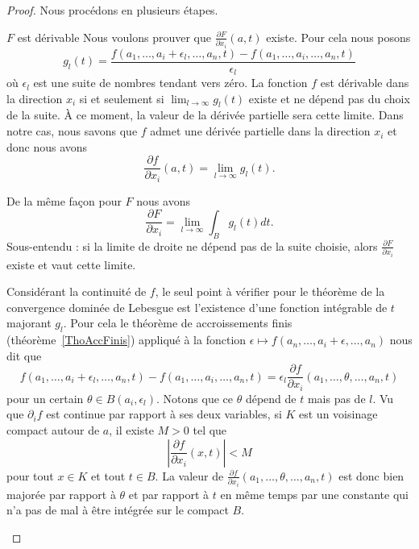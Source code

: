 \begin{proof}
	Nous procédons en plusieurs étapes.
	\begin{subproof}
		\item[\( F\) est dérivable]
		Nous voulons prouver que \( \frac{ \partial F }{ \partial x_i }(a,t)\) existe. Pour cela nous posons
		\begin{equation}
			g_l(t)=\frac{ f(a_1,\ldots, a_i+\epsilon_l,\ldots, a_n,t)-f(a_1,\ldots, a_i,\ldots, a_n,t) }{ \epsilon_l }
		\end{equation}
		où \( \epsilon_l\) est une suite de nombres tendant vers zéro. La fonction \( f\) est dérivable dans la direction \( x_i\) si et seulement si \( \lim_{l\to \infty}g_l(t) \) existe et ne dépend pas du choix de la suite. À ce moment, la valeur de la dérivée partielle sera cette limite. Dans notre cas, nous savons que \( f\) admet une dérivée partielle dans la direction \( x_i\) et donc nous avons
		\begin{equation}
			\frac{ \partial f }{ \partial x_i }(a,t)=\lim_{l\to \infty} g_l(t).
		\end{equation}

		De la même façon pour \( F\) nous avons
		\begin{equation}
			\frac{ \partial F }{ \partial x_i }=\lim_{l\to \infty} \int_{B}g_l(t)dt.
		\end{equation}
		Sous-entendu : si la limite de droite ne dépend pas de la suite choisie, alors \( \frac{ \partial F }{ \partial x_i }\) existe et vaut cette limite.

		Considérant la continuité de \( f\), le seul point à vérifier pour le théorème de la convergence dominée de Lebesgue est l'existence d'une fonction intégrable de \( t\) majorant \( g_l\). Pour cela le théorème de accroissements finis (théorème~\ref{ThoAccFinis}) appliqué à la fonction \( \epsilon\mapsto f(a_n,\ldots, a_i+\epsilon,\ldots, a_n)\) nous dit que
		\begin{equation}
			f(a_1,\ldots, a_i+\epsilon_l,\ldots, a_n,t)-f(a_1,\ldots, a_i,\ldots, a_n,t)=\epsilon_l\frac{ \partial f }{ \partial x_i }(a_1,\ldots, \theta,\ldots, a_n,t)
		\end{equation}
		pour un certain \( \theta\in B(a_i,\epsilon_l)\). Notons que ce \( \theta\) dépend de \( t\) mais pas de \( l\). Vu que \( \partial_if\) est continue par rapport à ses deux variables, si \( K\) est un voisinage compact autour de \( a\), il existe \( M>0\) tel que
		\begin{equation}    \label{EqMXqviPC}
			\left| \frac{ \partial f }{ \partial x_i }(x,t) \right| < M
		\end{equation}
		pour tout \( x\in K\) et tout \( t\in B\). La valeur de \( \frac{ \partial f }{ \partial x_i }(a_1,\ldots, \theta,\ldots, a_n,t)\) est donc bien majorée par rapport à \( \theta\) et par rapport à \( t\) en même temps par une constante qui n'a pas de mal à être intégrée sur le compact \( B\).


\end{subproof}
\end{proof}
